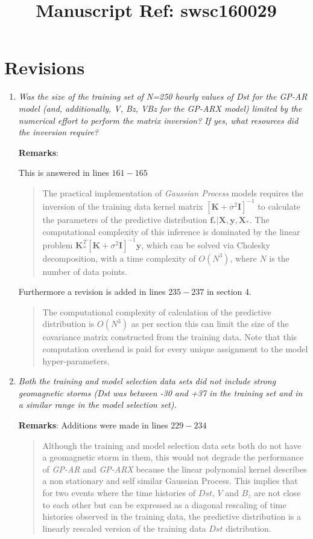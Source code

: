 \documentclass{article}
\begin{document}
\title{Manuscript Ref: swsc160029}
\maketitle
\section{Revisions}
\begin{enumerate}
\item \emph{Was the size of the training set of N=250 hourly values of Dst for the GP-AR model (and, additionally, V, Bz, VBz for the GP-ARX model) limited by the numerical effort to perform the matrix inversion? If yes, what resources did the inversion require?}

\textbf{Remarks}: 

This is answered in lines $161-165$ \blockquote{The practical implementation of \emph{Gaussian Process} models requires the inversion of the training data kernel matrix $[\mathbf{K} + \sigma^{2} \mathbf{I}]^{-1}$ to calculate the parameters of the predictive distribution $\mathbf{f_*}|\mathbf{X},\mathbf{y},\mathbf{X_*}$. The computational complexity of this inference is dominated by the linear problem $\mathbf{K}^T_{*} [\mathbf{K} + \sigma^{2} \mathbf{I}]^{-1} \mathbf{y}$, which can be solved via Cholesky decomposition, with a time complexity of $O(N^3)$, where $N$ is the number of data points.} 

Furthermore a revision is added in lines $235-237$ in section 4. \blockquote{The computational complexity of calculation of the predictive distribution is $O(N^3)$ as per section \label{sec:inference} this can limit the size of the covariance matrix constructed from the training data. Note that this computation overhead is paid for every unique assignment to the model hyper-parameters.}

\item \emph{Both the training and model selection data sets did not include strong geomagnetic storms (Dst was between -30 and +37 in the training set and in a similar range in the model selection set).} 

\textbf{Remarks}: Additions were made in lines $229-234$ \blockquote{Although the training and model selection data sets both do not have a geomagnetic storm in them, this would not degrade the performance of \emph{GP-AR} and \emph{GP-ARX} because the linear polynomial kernel describes a non stationary and self similar Gaussian Process. This implies that for two events where the time histories of $Dst$, $V$ and $B_z$ are not close to each other but can be expressed as a diagonal rescaling of time histories observed in the training data, the predictive distribution is a linearly rescaled version of the training data $Dst$ distribution.}


\end{enumerate}
\end{document}
